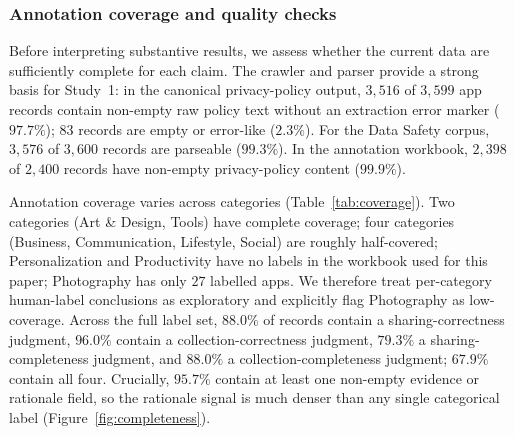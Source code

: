 \documentclass[11pt,a4paper]{article}
\begin{document}
\subsubsection{Annotation coverage and quality checks}
Before interpreting substantive results, we assess whether the current
data are sufficiently complete for each claim. The crawler and parser
provide a strong basis for Study~1: in the canonical privacy-policy
output, $3{,}516$ of $3{,}599$ app records contain non-empty raw
policy text without an extraction error marker ($97.7\%$); $83$ records
are empty or error-like ($2.3\%$). For the Data Safety corpus, $3{,}576$
of $3{,}600$ records are parseable ($99.3\%$). In the annotation
workbook, $2{,}398$ of $2{,}400$ records have non-empty privacy-policy
content ($99.9\%$).

Annotation coverage varies across categories
(Table~\ref{tab:coverage}). Two categories (Art \& Design, Tools) have
complete coverage; four categories (Business, Communication, Lifestyle,
Social) are roughly half-covered; Personalization and Productivity have
no labels in the workbook used for this paper; Photography has only $27$
labelled apps. We therefore treat per-category human-label conclusions
as exploratory and explicitly flag Photography as low-coverage. Across
the full label set, $88.0\%$ of records contain a sharing-correctness
judgment, $96.0\%$ contain a collection-correctness judgment, $79.3\%$ a
sharing-completeness judgment, and $88.0\%$ a collection-completeness
judgment; $67.9\%$ contain all four. Crucially, $95.7\%$ contain at least
one non-empty evidence or rationale field, so the rationale signal is
much denser than any single categorical label
(Figure~\ref{fig:completeness}).
\end{document}
